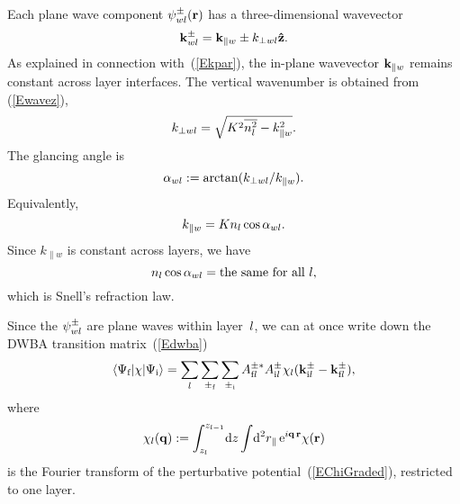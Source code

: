 Each plane wave component $\psi^\pm_{wl}(\mathbf{r})$ has
a three-dimensional wavevector
\begin{equation}\label{Ekpmwj3}
  \mathbf{k}^\pm_{wl}= \mathbf{k}_{\parallel w} \pm k_{\perp wl}\mathbf{\hat z}.
\end{equation}
%
%
As explained in connection with~(\ref{Ekpar}),
the in-plane wavevector $\mathbf{k}_{\parallel w}$ remains constant
across layer interfaces.
The vertical wavenumber is obtained from (\ref{Ewavez}),
\begin{equation}\label{Ekperpwj}
  k_{\perp wl} = \sqrt{K^2 \overline{n_l^2} - k_{\parallel w}^2}.
\end{equation}
The glancing angle is
\begin{equation}\label{Edef_alpha}
  \alpha_{wl}:=\arctan(k_{\perp wl}/k_{\parallel w}).  
\end{equation}
Equivalently,
\begin{equation}
  k_{\parallel w}=K n_l \cos\alpha_{wl}. 
\end{equation}
Since $k_{\parallel w}$ is constant across layers,
we have
\begin{equation}\label{ESnell}
  n_l \cos\alpha_{wl} = \text{the same for all }l,
\end{equation}
which is Snell's refraction law.

Since the $\psi^\pm_{wl}$ are plane waves within layer~$l$,
we can at once write down the DWBA transition matrix~(\ref{Edwba})
%
\begin{equation}\label{Edwba_ml0}
  \left\langle \Psi_{\text{f}}|\chi|\Psi_{\text{i}}\right\rangle
  = \sum_{l} \sum_{\pm_{\text{f}}} \sum_{\pm_{\text{i}}}
    A^{\pm *}_{\text{f} l} A^\pm_{\text{i} l} 
     \chi_l(\mathbf{k}^\pm_{\text{i} l}-\mathbf{k}^\pm_{\text{f} l}),
\end{equation}
where
\begin{equation}\label{Echij}
  \chi_l(\mathbf{q})
  := \int_{z_l}^{z_{l-1}}\!\text{d} z \int\!\text{d}^2r_\parallel\, \text{e}^{i\mathbf{q}\,\mathbf{r}}\chi(\mathbf{r})
\end{equation}
%
is the Fourier transform
of the perturbative potential~(\ref{EChiGraded}),
restricted to one layer.

